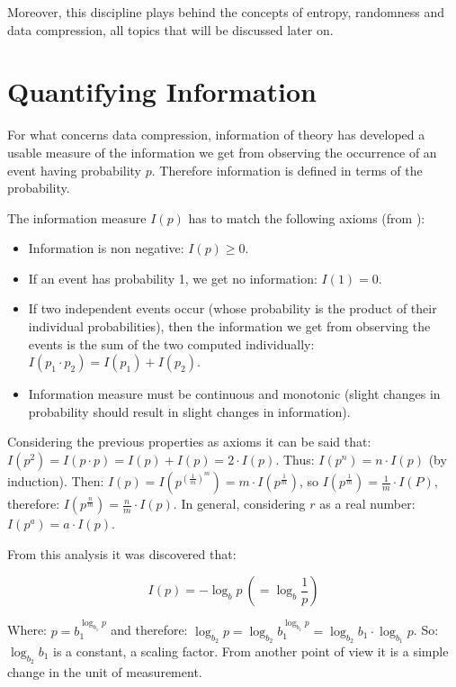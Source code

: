 \documentclass[12pt, a4paper]{report}
\begin{document}
Moreover, this discipline plays behind the concepts of entropy, randomness and data compression, all topics that will be discussed
later on.

\section{Quantifying Information}

For what concerns data compression, information of theory has developed a usable measure of the information we get from observing
the occurrence of an event having probability \(p\). Therefore information is defined in terms of the probability.

The information measure \(I(p)\) has to match the following axioms (from \cite{AnIntroductionToInformationTheoryAndEntropy}):

\begin{itemize}
  \item Information is non negative: \(I(p) \geq 0\).
  \item If an event has probability 1, we get no information: \(I(1) = 0\).
  \item If two independent events occur (whose probability is the product of their individual probabilities), then the information
  we get from observing the events is the sum of the two computed individually: \(I(p_1 \cdot p_2) = I(p_1) + I(p_2)\).
  \item Information measure must be continuous and monotonic (slight changes in probability should result in slight changes in
  information).
\end{itemize}

Considering the previous properties as axioms it can be said that: \(I(p^2) = I(p \cdot p) = I(p) + I(p) = 2 \cdot I(p)\).
Thus: \(I(p^n) = n \cdot I(p)\) (by induction).
Then: \(I(p) = I(p^{(\frac{1}{m})^m}) = m \cdot I(p^{\frac{1}{m}})\), so \(I(p^{\frac{1}{m}}) = \frac{1}{m} \cdot I(P)\),
therefore: \(I(p^{\frac{n}{m}}) = \frac{n}{m} \cdot I(p)\).
In general, considering \(r\) as a real number: \(I(p^a) = a \cdot I(p)\).

From this analysis it was discovered that:

\begin{equation} \label{eq:information1}
  I(p) = - \log_b p \ (= \log_b \frac{1}{p})
\end{equation}

Where: \(p = b_1^{\log_{b_1} p}\) and therefore: \(\log_{b_2} p = \log_{b_2} b_1^{\log_{b_1} p} = \log_{b_2} b_1 \cdot \log_{b_1}
p\). So: \(\log_{b_2} b_1\) is a constant, a scaling factor.
From another point of view it is a simple change in the unit of measurement.
\end{document}
